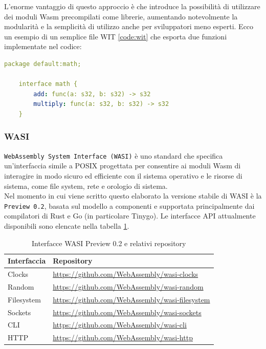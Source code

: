 L'enorme vantaggio di questo approccio è che introduce la possibilità di utilizzare dei moduli Wasm precompilati come librerie, aumentando notevolmente la modularità e la semplicità di utilizzo anche per sviluppatori meno esperti. Ecco un esempio di un semplice file WIT \ref{code:wit} che esporta due funzioni implementate nel codice:
\begin{lstlisting}[language=yaml, caption={Esempio file WIT}, captionpos=b, label={code:wit}]
    package default:math;
    
    interface math {
        add: func(a: s32, b: s32) -> s32
        multiply: func(a: s32, b: s32) -> s32
    }
\end{lstlisting}

\subsubsection{WASI}
\label{sec:wasi}
\texttt{WebAssembly System Interface (WASI)}\cite{WASI2024} è uno standard che specifica un'interfaccia simile a POSIX progettata per consentire ai moduli Wasm di interagire in modo sicuro ed efficiente con il sistema operativo e le risorse di sistema, come file system, rete e orologio di sistema.\\
Nel momento in cui viene scritto questo elaborato la versione stabile di WASI è la \texttt{Preview 0.2}\cite{WASI2024}, basata sul modello a componenti e supportata principalmente dai compilatori di Rust e Go (in particolare Tinygo). Le interfacce API attualmente disponibili sono elencate nella tabella \ref{tab:wasi_interfaces}.

\begin{table}[h]
    \centering
    \small
    \begin{tabular}{|l|l|}
        \hline
        \textbf{Interfaccia} & \textbf{Repository} \\
        \hline
        \arrayrulecolor[gray]{0.7}
        \arrayrulewidth=0.4pt
        Clocks     & \url{https://github.com/WebAssembly/wasi-clocks} \\
        \hline
        Random     & \url{https://github.com/WebAssembly/wasi-random} \\
        \hline
        Filesystem & \url{https://github.com/WebAssembly/wasi-filesystem} \\
        \hline
        Sockets    & \url{https://github.com/WebAssembly/wasi-sockets} \\
        \hline
        CLI        & \url{https://github.com/WebAssembly/wasi-cli} \\
        \hline
        HTTP       & \url{https://github.com/WebAssembly/wasi-http} \\
        \hline
    \end{tabular}
    \caption{Interfacce WASI Preview 0.2 e relativi repository}
    \label{tab:wasi_interfaces}
\end{table}

